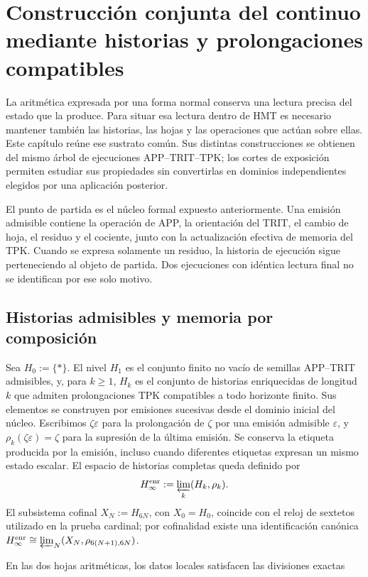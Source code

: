 \section{Construcción conjunta del continuo mediante historias y prolongaciones compatibles}
\label{act21:iv:continuo-conjunto}
La aritmética expresada por una forma normal conserva una lectura precisa del estado que la produce. Para situar esa lectura dentro de HMT es necesario mantener también las historias, las hojas y las operaciones que actúan sobre ellas. Este capítulo reúne ese sustrato común. Sus distintas construcciones se obtienen del mismo árbol de ejecuciones APP–TRIT–TPK; los cortes de exposición permiten estudiar sus propiedades sin convertirlas en dominios independientes elegidos por una aplicación posterior.

El punto de partida es el núcleo formal expuesto anteriormente. Una emisión admisible contiene la operación de APP, la orientación del TRIT, el cambio de hoja, el residuo y el cociente, junto con la actualización efectiva de memoria del TPK. Cuando se expresa solamente un residuo, la historia de ejecución sigue perteneciendo al objeto de partida. Dos ejecuciones con idéntica lectura final no se identifican por ese solo motivo.

\subsection{Historias admisibles y memoria por composición}
Sea \(H_0:=\{\ast\}\). El nivel \(H_1\) es el conjunto finito no vacío de
semillas APP--TRIT admisibles, y, para \(k\geq1\), \(H_k\) es el conjunto de
historias enriquecidas de longitud \(k\) que admiten prolongaciones TPK
compatibles a todo horizonte finito. Sus elementos se construyen por emisiones
sucesivas desde el dominio inicial del núcleo. Escribimos \(\zeta\varepsilon\)
para la prolongación de \(\zeta\) por una emisión admisible \(\varepsilon\), y
\(\rho_k(\zeta\varepsilon)=\zeta\) para la supresión de la última emisión. Se
conserva la etiqueta producida por la emisión, incluso cuando diferentes
etiquetas expresan un mismo estado escalar. El espacio de historias completas
queda definido por
\[
 H_\infty^{\rm enr}:=\varprojlim_k(H_k,\rho_k).
\]
El subsistema cofinal \(X_N:=H_{6N}\), con \(X_0=H_0\), coincide con el reloj
de sextetos utilizado en la prueba cardinal; por cofinalidad existe una
identificación canónica
\(H_\infty^{\rm enr}\cong\varprojlim_N(X_N,\rho_{6(N+1),6N})\).

En las dos hojas aritméticas, los datos locales satisfacen las divisiones exactas

